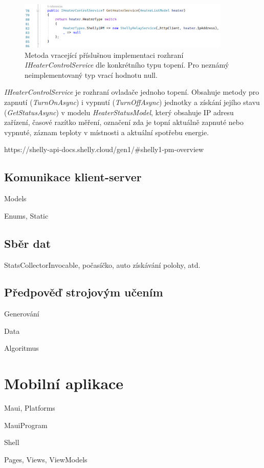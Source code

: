 \begin{figure}[hbt]
\includegraphics[width=0.9\textwidth]{obrazky-figures/code-heaterservice-decode.png}
\caption{Metoda vracející příslušnou implementaci rozhraní {\it IHeaterControlService} dle konkrétního typu topení. Pro neznámý neimplementovaný typ vrací hodnotu null.}
\end{figure}

{\it IHeaterControlService} je rozhraní ovladače jednoho topení. Obsahuje metody pro zapnutí ({\it TurnOnAsync}) i vypnutí ({\it TurnOffAsync}) jednotky a získání jejího stavu ({\it GetStatusAsync}) v modelu {\it HeaterStatusModel}, který obsahuje IP adresu zařízení, časové razítko měření, označení zda je topní aktuálně zapnuté nebo vypnuté, záznam teploty v místnosti a aktuální spotřebu energie.

https://shelly-api-docs.shelly.cloud/gen1/#shelly1-pm-overview


\subsection{Komunikace klient-server}
Models

Enums, Static


\subsection{Sběr dat}
StatsCollectorInvocable, počasíčko, auto získávání polohy, atd.


\subsection{Předpověď strojovým učením}
Generování

Data

Algoritmus


\section{Mobilní aplikace}
Maui, Platforms

MauiProgram

Shell

Pages, Views, ViewModels

